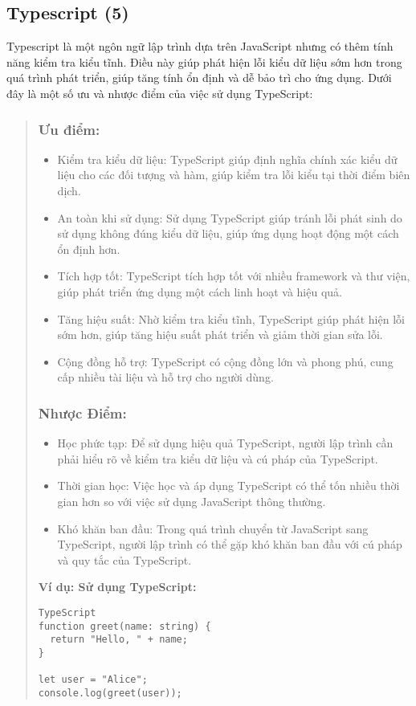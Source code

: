 \subsection{Typescript (5)}
Typescript là một ngôn ngữ lập trình dựa trên JavaScript nhưng có thêm tính năng kiểm tra kiểu tĩnh. Điều này giúp phát hiện lỗi kiểu dữ liệu sớm hơn trong quá trình phát triển, giúp tăng tính ổn định và dễ bảo trì cho ứng dụng. Dưới đây là một số ưu và nhược điểm của việc sử dụng TypeScript:

\begin{quote}
\subsubsection{Ưu điểm:}
\begin{itemize}
  \item Kiểm tra kiểu dữ liệu: TypeScript giúp định nghĩa chính xác kiểu dữ liệu cho các đối tượng và hàm, giúp kiểm tra lỗi kiểu tại thời điểm biên dịch.
  \item An toàn khi sử dụng: Sử dụng TypeScript giúp tránh lỗi phát sinh do sử dụng không đúng kiểu dữ liệu, giúp ứng dụng hoạt động một cách ổn định hơn.
  \item Tích hợp tốt: TypeScript tích hợp tốt với nhiều framework và thư viện, giúp phát triển ứng dụng một cách linh hoạt và hiệu quả.
  \item Tăng hiệu suất: Nhờ kiểm tra kiểu tĩnh, TypeScript giúp phát hiện lỗi sớm hơn, giúp tăng hiệu suất phát triển và giảm thời gian sửa lỗi.
  \item Cộng đồng hỗ trợ: TypeScript có cộng đồng lớn và phong phú, cung cấp nhiều tài liệu và hỗ trợ cho người dùng.
\end{itemize}

\subsubsection{Nhược Điểm:}
\begin{itemize}
  \item Học phức tạp: Để sử dụng hiệu quả TypeScript, người lập trình cần phải hiểu rõ về kiểm tra kiểu dữ liệu và cú pháp của TypeScript.
  \item Thời gian học: Việc học và áp dụng TypeScript có thể tốn nhiều thời gian hơn so với việc sử dụng JavaScript thông thường.
  \item Khó khăn ban đầu: Trong quá trình chuyển từ JavaScript sang TypeScript, người lập trình có thể gặp khó khăn ban đầu với cú pháp và quy tắc của TypeScript.
\end{itemize}

\textbf{Ví dụ: Sử dụng TypeScript:}
\begin{lstlisting}
TypeScript
function greet(name: string) {
  return "Hello, " + name;
}

let user = "Alice";
console.log(greet(user));
\end{lstlisting}
\end{quote}

